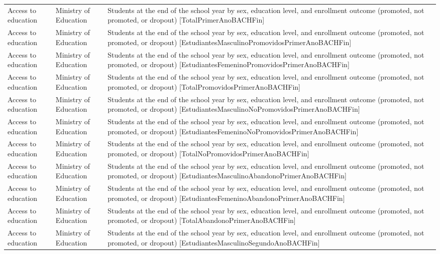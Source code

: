 \documentclass[10pt,a4paper]{article}
\begin{document}
\begin{longtable}{@{}>{\raggedright\arraybackslash}p{3.5cm}>{\raggedright\arraybackslash}p{5.6cm}>{\raggedright\arraybackslash}p{\dimexpr\textwidth-9.1cm-4\tabcolsep\relax}@{}}
Access to education & Ministry of Education & Students at the end of the school year by sex, education level, and enrollment outcome (promoted, not promoted, or dropout) [TotalPrimerAnoBACHFin]\\
Access to education & Ministry of Education & Students at the end of the school year by sex, education level, and enrollment outcome (promoted, not promoted, or dropout) [EstudiantesMasculinoPromovidosPrimerAnoBACHFin]\\
Access to education & Ministry of Education & Students at the end of the school year by sex, education level, and enrollment outcome (promoted, not promoted, or dropout) [EstudiantesFemeninoPromovidosPrimerAnoBACHFin]\\
Access to education & Ministry of Education & Students at the end of the school year by sex, education level, and enrollment outcome (promoted, not promoted, or dropout) [TotalPromovidosPrimerAnoBACHFin]\\
Access to education & Ministry of Education & Students at the end of the school year by sex, education level, and enrollment outcome (promoted, not promoted, or dropout) [EstudiantesMasculinoNoPromovidosPrimerAnoBACHFin]\\
Access to education & Ministry of Education & Students at the end of the school year by sex, education level, and enrollment outcome (promoted, not promoted, or dropout) [EstudiantesFemeninoNoPromovidosPrimerAnoBACHFin]\\
Access to education & Ministry of Education & Students at the end of the school year by sex, education level, and enrollment outcome (promoted, not promoted, or dropout) [TotalNoPromovidosPrimerAnoBACHFin]\\
Access to education & Ministry of Education & Students at the end of the school year by sex, education level, and enrollment outcome (promoted, not promoted, or dropout) [EstudiantesMasculinoAbandonoPrimerAnoBACHFin]\\
Access to education & Ministry of Education & Students at the end of the school year by sex, education level, and enrollment outcome (promoted, not promoted, or dropout) [EstudiantesFemeninoAbandonoPrimerAnoBACHFin]\\
Access to education & Ministry of Education & Students at the end of the school year by sex, education level, and enrollment outcome (promoted, not promoted, or dropout) [TotalAbandonoPrimerAnoBACHFin]\\
Access to education & Ministry of Education & Students at the end of the school year by sex, education level, and enrollment outcome (promoted, not promoted, or dropout) [EstudiantesMasculinoSegundoAnoBACHFin]\\

\end{longtable}
\end{document}
